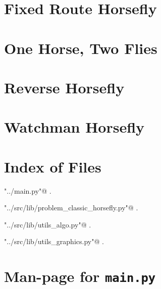 \documentclass[11.5pt]{report}
\begin{document}

\label{chap:segment-horsefly}\chapter{Fixed Route Horsefly}
\label{chap:fixed-route-horsefly}\chapter{One Horse, Two Flies}
\label{chap:one-horse-two-flies}
\chapter{Reverse Horsefly}
\label{chap:reverse-horsefly}\chapter{Watchman Horsefly}
\label{watchman-horsefly}

\begin{appendices}
\chapter{Index of Files}

{\small\begin{list}{}{\setlength{\itemsep}{-\parsep}\setlength{\itemindent}{-\leftmargin}}
\item \verb@"../main.py"@ {\footnotesize {\NWtxtDefBy} .}
\item \verb@"../src/lib/problem_classic_horsefly.py"@ {\footnotesize {\NWtxtDefBy} .}
\item \verb@"../src/lib/utils_algo.py"@ {\footnotesize {\NWtxtDefBy} .
}
\item \verb@"../src/lib/utils_graphics.py"@ {\footnotesize {\NWtxtDefBy} .
}
\end{list}}
\chapter{Man-page for \texttt{main.py}}


\end{appendices}
\end{document}
